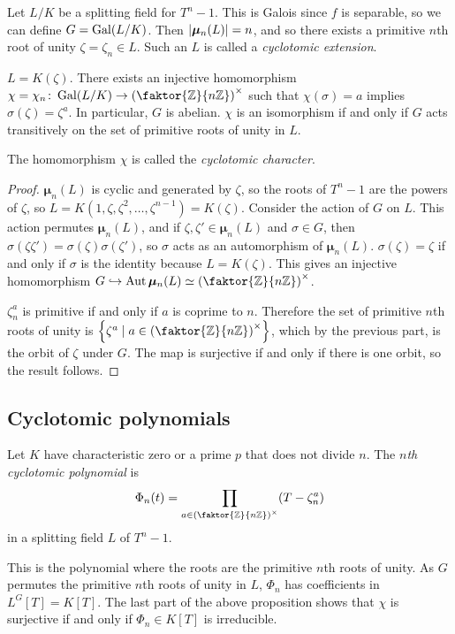 Let \( L / K \) be a splitting field for \( T^n - 1 \).
This is Galois since \( f \) is separable, so we can define \( G = \operatorname{Gal}(L/K) \).
Then \( \abs{\bm \mu_n(L)} = n \), and so there exists a primitive \( n \)th root of unity \( \zeta = \zeta_n \in L \).
Such an \( L \) is called a \emph{cyclotomic extension}.
\begin{proposition}
	\( L = K(\zeta) \).
	There exists an injective homomorphism \( \chi = \chi_n \colon \Gal(L/K) \to \qty(\faktor{\mathbb Z}{n\mathbb Z})^\times \) such that \( \chi(\sigma) = a \) implies \( \sigma(\zeta) = \zeta^a \).
	In particular, \( G \) is abelian.
	\( \chi \) is an isomorphism if and only if \( G \) acts transitively on the set of primitive roots of unity in \( L \).
\end{proposition}
The homomorphism \( \chi \) is called the \emph{cyclotomic character}.
\begin{proof}
	\( \bm \mu_n(L) \) is cyclic and generated by \( \zeta \), so the roots of \( T^n - 1 \) are the powers of \( \zeta \), so \( L = K(1,\zeta,\zeta^2,\dots,\zeta^{n-1}) = K(\zeta) \).
	Consider the action of \( G \) on \( L \).
	This action permutes \( \bm \mu_n(L) \), and if \( \zeta, \zeta' \in \bm \mu_n(L) \) and \( \sigma \in G \), then \( \sigma(\zeta\zeta') = \sigma(\zeta)\sigma(\zeta') \), so \( \sigma \) acts as an automorphism of \( \bm \mu_n(L) \).
	\( \sigma(\zeta) = \zeta \) if and only if \( \sigma \) is the identity because \( L = K(\zeta) \).
	This gives an injective homomorphism \( G \hookrightarrow \Aut \bm \mu_n(L) \simeq \qty(\faktor{\mathbb Z}{n\mathbb Z})^\times \).

	\( \zeta_n^a \) is primitive if and only if \( a \) is coprime to \( n \).
	Therefore the set of primitive \( n \)th roots of unity is \( \qty{\zeta^a \mid a \in \qty(\faktor{\mathbb Z}{n\mathbb Z})^\times} \), which by the previous part, is the orbit of \( \zeta \) under \( G \).
	The map is surjective if and only if there is one orbit, so the result follows.
\end{proof}

\subsection{Cyclotomic polynomials}
\begin{definition}
	Let \( K \) have characteristic zero or a prime \( p \) that does not divide \( n \).
	The \emph{\( n \)th cyclotomic polynomial} is
	\[ \Phi_n(t) = \prod_{a \in \qty(\faktor{\mathbb Z}{n\mathbb Z})^\times} (T - \zeta_n^a) \]
	in a splitting field \( L \) of \( T^n - 1 \).
\end{definition}
This is the polynomial where the roots are the primitive \( n \)th roots of unity.
As \( G \) permutes the primitive \( n \)th roots of unity in \( L \), \( \Phi_n \) has coefficients in \( L^G[T] = K[T] \).
The last part of the above proposition shows that \( \chi \) is surjective if and only if \( \Phi_n \in K[T] \) is irreducible.

